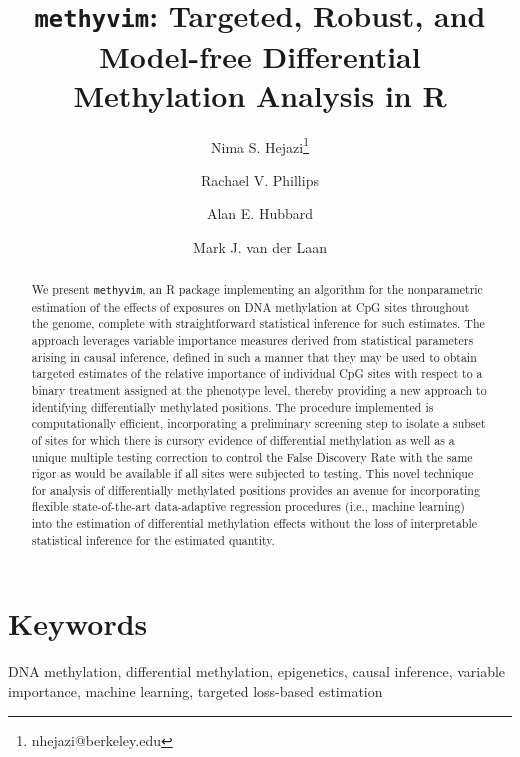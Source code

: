 \documentclass[9pt,a4paper,]{extarticle}
\theoremstyle{definition}
\theoremstyle{definition}
\theoremstyle{definition}
\theoremstyle{remark}
\begin{document}
\pagestyle{front}

\title{\texttt{methyvim}: Targeted, Robust, and Model-free Differential Methylation Analysis in R}

\author[1,2]{Nima S. Hejazi\thanks{\ttfamily nhejazi@berkeley.edu}}
\author[1]{Rachael V. Phillips}
\author[1]{Alan E. Hubbard}
\author[1,3]{Mark J. van der Laan}

\maketitle
\thispagestyle{front}

\begin{abstract}
We present \texttt{methyvim}, an R package implementing an algorithm for the
nonparametric estimation of the effects of exposures on DNA methylation at CpG
sites throughout the genome, complete with straightforward statistical
inference for such estimates. The approach leverages variable importance
measures derived from statistical parameters arising in causal inference,
defined in such a manner that they may be used to obtain targeted estimates of
the relative importance of individual CpG sites with respect to a binary
treatment assigned at the phenotype level, thereby providing a new approach to
identifying differentially methylated positions. The procedure implemented is
computationally efficient, incorporating a preliminary screening step to
isolate a subset of sites for which there is cursory evidence of differential
methylation as well as a unique multiple testing correction to control the
False Discovery Rate with the same rigor as would be available if all sites
were subjected to testing. This novel technique for analysis of differentially
methylated positions provides an avenue for incorporating flexible
state-of-the-art data-adaptive regression procedures (i.e., machine learning)
into the estimation of differential methylation effects without the loss of
interpretable statistical inference for the estimated quantity.
\end{abstract}

\section*{Keywords}
DNA methylation, differential methylation, epigenetics, causal inference, variable importance, machine learning, targeted loss-based estimation
\end{document}
